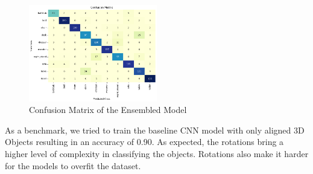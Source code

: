 \begin{figure}[h]
\begin{center}
        \centering
        \includegraphics[width=0.5\textwidth]{resources/confusion_matrix_ensemble.png}
        \caption{Confusion Matrix of the Ensembled Model}
        \label{fig:confusion_matrix}
    \end{center}
\end{figure}

As a benchmark, we tried to train the baseline CNN model with only aligned 3D Objects resulting in an accuracy of 0.90. As expected, the rotations bring a higher level of complexity in classifying the objects. Rotations also make it harder for the models to overfit the dataset.